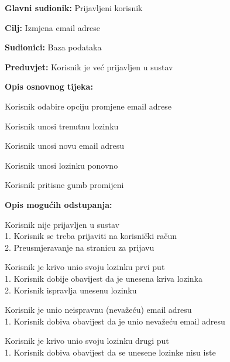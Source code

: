 					\noindent {}
					\begin{packed_item}
						\item \textbf{Glavni sudionik:} Prijavljeni korisnik
						\item \textbf{Cilj:} Izmjena email adrese
						\item \textbf{Sudionici:} Baza podataka
						\item \textbf{Preduvjet:} Korisnik je već prijavljen u sustav
						\item \textbf{Opis osnovnog tijeka:}
						\begin{packed_enum}
							\item Korisnik odabire opciju promjene email adrese
							\item Korisnik unosi trenutnu lozinku
							\item Korisnik unosi novu email adresu
							\item Korisnik unosi lozinku ponovno
							\item Korisnik pritisne gumb promijeni
						\end{packed_enum}
						\item \textbf{Opis mogućih odstupanja:}
						\begin{packed_item}
							\item [1.a] Korisnik nije prijavljen u sustav
							\\1. Korisnik se treba prijaviti na korisnički račun
							\\2. Preusmjeravanje na stranicu za prijavu
							\item [2.a] Korisnik je krivo unio svoju lozinku prvi put
							\\1. Korisnik dobije obavijest da je unesena kriva lozinka
							\\2. Korisnik ispravlja unesenu lozinku
							\item [3.a] Korisnik je unio neispravnu (nevažeću) email adresu
							\\1. Korisnik dobiva obavijest da je unio nevažeću email adresu
							\item [4.a] Korisnik je krivo unio svoju lozinku drugi put
							\\1. Korisnik dobiva obavijest da se unesene lozinke nisu iste
						\end{packed_item}
					\end{packed_item}

